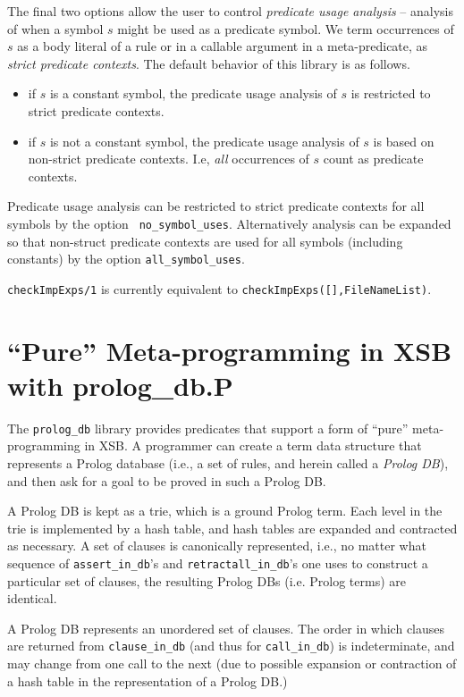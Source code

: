 \begin{description}
The final two options allow the user to control {\em predicate usage
  analysis} -- analysis of when a symbol $s$ might be used as a
predicate symbol.  We term occurrences of $s$ as a body literal of a
rule or in a callable argument in a meta-predicate, as {\em strict
  predicate contexts}.  The default behavior of this library is as
follows.
\begin{itemize}
\item if $s$ is a constant symbol, the predicate usage analysis of $s$
  is restricted to strict predicate contexts.
\item if $s$ is not a constant symbol, the predicate usage analysis of
  $s$ is based on non-strict predicate contexts.  I.e, {\em all}
  occurrences of $s$ count as predicate contexts.
\end{itemize}
Predicate usage analysis can be restricted to strict predicate
contexts for all symbols by the option {\tt
  no\_symbol\_uses}. Alternatively analysis can be expanded so that
non-struct predicate contexts are used for all symbols (including
constants) by the option {\tt all\_symbol\_uses}.


%
{\tt checkImpExps/1}  is
currently equivalent to {\tt checkImpExps([],FileNameList)}.
\end{description}

\section{``Pure'' Meta-programming in XSB with prolog\_db.P}

The {\tt prolog\_db} library provides predicates that support a form of
``pure'' meta-programming in XSB.  A programmer can create a term data
structure that represents a Prolog database (i.e., a set of rules, and
herein called a {\em Prolog DB}), and then ask for a goal to be proved
in such a Prolog DB.  

A Prolog DB is kept as a trie, which is a ground Prolog term.  Each
level in the trie is implemented by a hash table, and hash tables are
expanded and contracted as necessary.  A set of clauses is canonically
represented, i.e., no matter what sequence of {\tt assert\_in\_db}'s
and {\tt retractall\_in\_db}'s one uses to construct a particular set
of clauses, the resulting Prolog DBs (i.e. Prolog terms) are identical.

A Prolog DB represents an unordered set of clauses.  The order in
which clauses are returned from {\tt clause\_in\_db} (and thus for
{\tt call\_in\_db}) is indeterminate, and may change from one call to
the next (due to possible expansion or contraction of a hash table in
the representation of a Prolog DB.)

